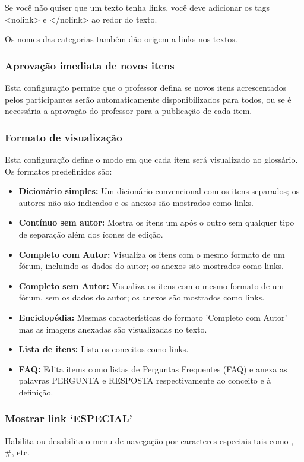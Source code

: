 Se você não quiser que um texto tenha links, você deve adicionar os tags <nolink> e </nolink> ao redor do texto.

Os nomes das categorias também dão origem a links nos textos.
\subsubsection{Aprovação imediata de novos itens}
Esta configuração permite que o professor defina se novos itens acrescentados pelos participantes serão automaticamente disponibilizados para todos, ou se é necessária a aprovação do professor para a publicação de cada item.
\subsubsection{Formato de visualização}
Esta configuração define o modo em que cada item será visualizado no glossário. Os formatos predefinidos são:

\begin{itemize}
\item \textbf{Dicionário simples:}
Um dicionário convencional com os itens separados; os autores não são indicados e os anexos são mostrados como links.

\item \textbf{Contínuo sem autor:}
Mostra os itens um após o outro sem qualquer tipo de separação além dos ícones de edição.

\item \textbf{Completo com Autor:}
Visualiza os itens com o mesmo formato de um fórum, incluindo os dados do autor; os anexos são mostrados como links.

\item \textbf{Completo sem Autor:}
Visualiza os itens com o mesmo formato de um fórum, sem os dados do autor; os anexos são mostrados como links.

\item \textbf{Enciclopédia:}
Mesmas características do formato 'Completo com Autor' mas as imagens anexadas são visualizadas no texto.

\item \textbf{Lista de itens:}
Lista os conceitos como links.

\item \textbf{FAQ:}
Edita items como listas de Perguntas Frequentes (FAQ) e anexa as palavras PERGUNTA e RESPOSTA respectivamente ao conceito e à definição.
\end{itemize}
\subsubsection{Mostrar link ‘ESPECIAL’}
Habilita ou desabilita o menu de navegação por caracteres especiais tais como \@, \#, etc.

